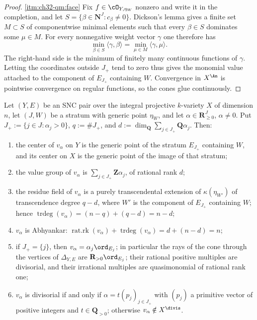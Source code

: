 \begin{proof}
\cref{itm:ch32-qm:face}  Fix $f\in\cO_{Y,\eta_W}$ nonzero and write it in
the completion, and let
$S=\{\beta\in\mathbf N^J:c_\beta\neq0\}$.  Dickson's lemma gives a finite
set $M\subset S$ of componentwise minimal elements such that every
$\beta\in S$ dominates some $\mu\in M$.  For every nonnegative weight
vector $\gamma$ one therefore has
\[
 \min_{\beta\in S}\langle\gamma,\beta\rangle
 =\min_{\mu\in M}\langle\gamma,\mu\rangle.
\]
The right-hand side is the minimum of finitely many continuous functions of
$\gamma$.  Letting the coordinates outside $J_+$ tend to zero thus gives
the monomial value attached to the component of $E_{J_+}$ containing $W$.
Convergence in $X^{\An}$ is pointwise convergence on regular functions, so
the cones glue continuously.
\end{proof}

\begin{theorem}
\label{thm:ch32-quasimonomial-invariants}
Let $(Y,E)$ be an SNC pair over the integral projective $k$-variety
$X$ of dimension $n$, let $(J,W)$ be a stratum with generic point
$\eta_W$, and let $\alpha\in\mathbf R_{\geq0}^J$, $\alpha\neq0$.  Put
$J_+:=\{j\in J:\alpha_j>0\}$, $q:=\#J_+$, and
$d:=\dim_{\mathbf Q}\sum_{j\in J_+}\mathbf Q\alpha_j$.  Then:
\begin{enumerate}
\item\label{itm:ch32-qi:center}
the center of $v_\alpha$ on $Y$ is the generic point of the stratum
$E_{J_+}$ containing $W$, and its center on $X$ is the generic point of
the image of that stratum;
\item\label{itm:ch32-qi:group}
the value group of $v_\alpha$ is $\sum_{j\in J_+}\mathbf Z\alpha_j$, of
rational rank $d$;
\item\label{itm:ch32-qi:residue}
the residue field of $v_\alpha$ is a purely transcendental extension of
$\kappa(\eta_{W'})$ of transcendence degree $q-d$, where $W'$ is the
component of $E_{J_+}$ containing $W$; hence
$\operatorname{trdeg}(v_\alpha)=(n-q)+(q-d)=n-d$;
\item\label{itm:ch32-qi:abhyankar}
$v_\alpha$ is Abhyankar:
$\operatorname{rat.rk}(v_\alpha)+\operatorname{trdeg}(v_\alpha)=d+(n-d)=n$;
\item\label{itm:ch32-qi:vertex}
if $J_+=\{j\}$, then $v_\alpha=\alpha_j\ord_{E_j}$; in particular the
rays of the cone through the vertices of $\Delta_{Y,E}$ are
$\mathbf R_{>0}\ord_{E_j}$; their rational positive multiples are
divisorial, and their irrational multiples are quasimonomial of rational
rank one;
\item\label{itm:ch32-qi:divisorial}
$v_\alpha$ is divisorial if and only if
$\alpha=t(p_j)_{j\in J_+}$ with $(p_j)$ a primitive vector of positive
integers and $t\in\mathbf Q_{>0}$; otherwise
$v_\alpha\notin X^{\divis}$.
\end{enumerate}
\end{theorem}

